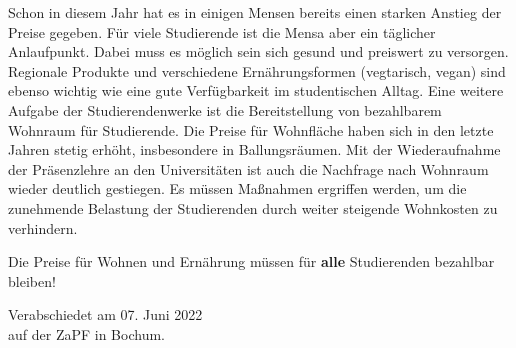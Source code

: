 \documentclass[DIV=calc]{scrartcl}
\begin{document}
Schon in diesem Jahr hat es in einigen Mensen bereits einen starken Anstieg der Preise gegeben.
Für viele Studierende ist die Mensa aber ein täglicher Anlaufpunkt. Dabei muss es möglich sein sich gesund und preiswert zu versorgen. Regionale Produkte und verschiedene Ernährungsformen (vegtarisch, vegan) sind ebenso wichtig wie eine gute Verfügbarkeit im studentischen Alltag. 
\newpage
Eine weitere Aufgabe der Studierendenwerke ist die Bereitstellung von bezahlbarem Wohnraum für Studierende. Die Preise für Wohnfläche haben sich in den letzte Jahren stetig erhöht, insbesondere in Ballungsräumen. Mit der Wiederaufnahme der Präsenzlehre an den Universitäten ist auch die Nachfrage nach Wohnraum wieder deutlich gestiegen. Es müssen Maßnahmen ergriffen werden, um die zunehmende Belastung der Studierenden durch weiter steigende Wohnkosten zu verhindern.

Die Preise für Wohnen und Ernährung müssen für \textbf{alle} Studierenden bezahlbar bleiben!








\vspace{1cm} 

\vfill
\begin{flushright}
	Verabschiedet am 07. Juni 2022 \\
	auf der ZaPF in Bochum.
\end{flushright}
\end{document}
